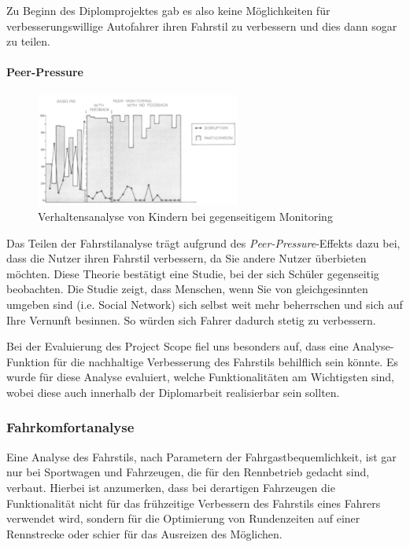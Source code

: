 Zu Beginn des Diplomprojektes gab es also keine Möglichkeiten für verbesserungswillige Autofahrer ihren Fahrstil zu verbessern und dies dann sogar zu teilen. 
\newpage
\paragraph{Peer-Pressure} 
\begin{figure}\centering
    \includegraphics[width=0.6\textwidth]{images/peerPressure}
    \caption{Verhaltensanalyse von Kindern bei gegenseitigem Monitoring \cite{SIMR.CH1-fahrstil-analyse.PeerPressure}} \label{Fig:imgPeerPressure}
\end{figure}
Das Teilen der Fahrstilanalyse trägt aufgrund des \textit{Peer-Pressure}-Effekts dazu bei, dass die Nutzer ihren Fahrstil verbessern, da Sie andere Nutzer überbieten möchten. Diese Theorie bestätigt eine Studie, bei der sich Schüler gegenseitig beobachten. Die Studie zeigt,  dass Menschen, wenn Sie von gleichgesinnten umgeben sind (i.e. Social Network) sich selbst weit mehr beherrschen und sich auf Ihre Vernunft besinnen. \cite{SIMR.CH1-fahrstil-analyse.PeerPressure} So würden sich Fahrer dadurch  stetig zu verbessern.

Bei der Evaluierung des Project Scope fiel uns besonders auf, dass eine Analyse-Funktion für die nachhaltige Verbesserung des Fahrstils behilflich sein könnte. Es wurde für diese Analyse evaluiert, welche Funktionalitäten am Wichtigsten sind, wobei diese auch innerhalb der Diplomarbeit realisierbar sein sollten. \newline

\subsubsection{Fahrkomfortanalyse}
Eine Analyse des Fahrstils, nach Parametern der Fahrgastbequemlichkeit, ist gar nur bei Sportwagen und Fahrzeugen, die für den Rennbetrieb gedacht sind, verbaut. Hierbei ist anzumerken, dass bei derartigen Fahrzeugen die Funktionalität nicht für das frühzeitige Verbessern des Fahrstils eines Fahrers verwendet wird, sondern für die Optimierung von Rundenzeiten auf einer Rennstrecke oder schier für das Ausreizen des Möglichen.

